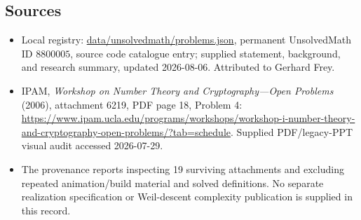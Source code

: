 \documentclass[11pt]{article}
\begin{document}
\subsection{Sources}
\begin{itemize}
\item Local registry: \url{data/unsolvedmath/problems.json}, permanent UnsolvedMath ID \(8800005\), source code catalogue entry; supplied statement, background, and research summary, updated 2026-08-06. Attributed to Gerhard Frey.
\item IPAM, \emph{Workshop on Number Theory and Cryptography---Open Problems} (2006), attachment 6219, PDF page 18, Problem 4: \url{https://www.ipam.ucla.edu/programs/workshops/workshop-i-number-theory-and-cryptography-open-problems/?tab=schedule}. Supplied PDF/legacy-PPT visual audit accessed 2026-07-29.
\item The provenance reports inspecting 19 surviving attachments and excluding repeated animation/build material and solved definitions. No separate realization specification or Weil-descent complexity publication is supplied in this record.
\end{itemize}
\end{document}
